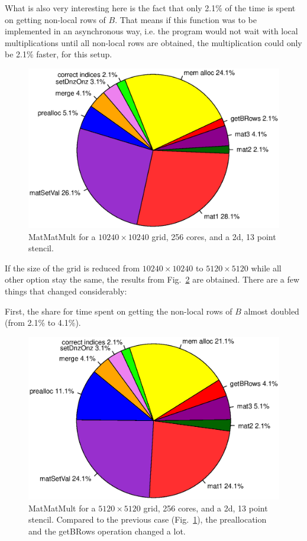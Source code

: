 What is also very interesting here is the fact that only 2.1\% of the time is spent on getting non-local rows of $B$. That means if this function was to be implemented in an asynchronous way, i.e. the program would not wait with local multiplications until all non-local rows are obtained, the multiplication could only be 2.1\% faster, for this setup. 

\begin{figure}[tbp]
	\centering
	\includegraphics[width=1\textwidth, trim={0 3.cm 0 3cm},clip]{256cores_10240}
	\caption{MatMatMult for a $10240\times 10240$ grid, 256 cores, and a 2d, 13 point stencil.} 
	\label{fig:pie_256_10240}
\end{figure}

If the size of the grid is reduced from $10240 \times 10240$ to $5120 \times 5120$ while all other option stay the same, the results from Fig.~\ref{fig:pie_256_5120} are obtained. There are a few things that changed considerably: 

First, the share for time spent on getting the non-local rows of $B$ almost doubled (from 2.1\% to 4.1\%).

\begin{figure}[tbp]
	\centering
	\includegraphics[width=1\textwidth, trim={0 3.cm 0 3cm},clip]{256cores_5120}
	\caption{MatMatMult for a $5120 \times 5120$ grid, 256 cores, and a 2d, 13 point stencil. Compared to the previous case (Fig.~\ref{fig:pie_256_10240}), the preallocation and the getBRows operation changed a lot.} 
	\label{fig:pie_256_5120}
\end{figure}


